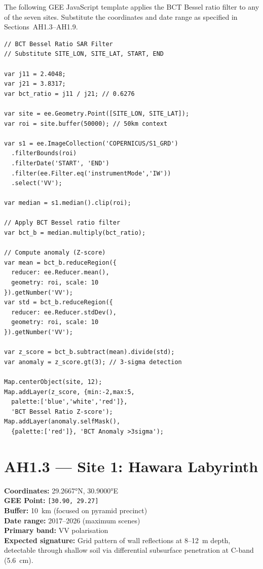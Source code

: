 \documentclass[12pt,twocolumn]{article}
\begin{document}
The following GEE JavaScript template applies the BCT
Bessel ratio filter to any of the seven sites. Substitute
the coordinates and date range as specified in
Sections~AH1.3--AH1.9.

\begin{verbatim}
// BCT Bessel Ratio SAR Filter
// Substitute SITE_LON, SITE_LAT, START, END

var j11 = 2.4048;
var j21 = 3.8317;
var bct_ratio = j11 / j21; // 0.6276

var site = ee.Geometry.Point([SITE_LON, SITE_LAT]);
var roi = site.buffer(50000); // 50km context

var s1 = ee.ImageCollection('COPERNICUS/S1_GRD')
  .filterBounds(roi)
  .filterDate('START', 'END')
  .filter(ee.Filter.eq('instrumentMode','IW'))
  .select('VV');

var median = s1.median().clip(roi);

// Apply BCT Bessel ratio filter
var bct_b = median.multiply(bct_ratio);

// Compute anomaly (Z-score)
var mean = bct_b.reduceRegion({
  reducer: ee.Reducer.mean(),
  geometry: roi, scale: 10
}).getNumber('VV');
var std = bct_b.reduceRegion({
  reducer: ee.Reducer.stdDev(),
  geometry: roi, scale: 10
}).getNumber('VV');

var z_score = bct_b.subtract(mean).divide(std);
var anomaly = z_score.gt(3); // 3-sigma detection

Map.centerObject(site, 12);
Map.addLayer(z_score, {min:-2,max:5,
  palette:['blue','white','red']},
  'BCT Bessel Ratio Z-score');
Map.addLayer(anomaly.selfMask(),
  {palette:['red']}, 'BCT Anomaly >3sigma');
\end{verbatim}

\section{AH1.3 --- Site 1: Hawara Labyrinth}

\textbf{Coordinates:} 29.2667°N, 30.9000°E\\
\textbf{GEE Point:} \verb|[30.90, 29.27]|\\
\textbf{Buffer:} 10~km (focused on pyramid precinct)\\
\textbf{Date range:} 2017--2026 (maximum scenes)\\
\textbf{Primary band:} VV polarisation\\
\textbf{Expected signature:} Grid pattern of wall reflections
at 8--12~m depth, detectable through shallow soil via
differential subsurface penetration at C-band (5.6~cm).
\end{document}
